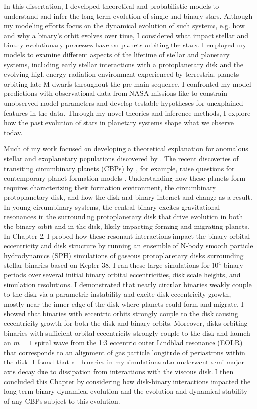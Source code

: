 In this dissertation, I developed theoretical and probabilistic models to understand and infer the long-term evolution of single and binary stars. Although my modeling efforts focus on the dynamical evolution of such systems, e.g. how and why a binary's orbit evolves over time, I considered what impact stellar and binary evolutionary processes have on planets orbiting the stars. I employed my models to examine different aspects of the lifetime of stellar and planetary systems, including early stellar interactions with a protoplanetary disk and the evolving high-energy radiation environment experienced by terrestrial planets orbiting late M-dwarfs throughout the pre-main sequence. I confronted my model predictions with observational data from NASA missions like \kepler to constrain unobserved model parameters and develop testable hypotheses for unexplained features in the data. Through my novel theories and inference methods, I explore how the past evolution of stars in planetary systems shape what we observe today.

Much of my work focused on developing a theoretical explanation for anomalous stellar and exoplanetary populations discovered by \kepler. The recent discoveries of transiting circumbinary planets (CBPs) by \kepler, for example, raise questions for contemporary planet formation models \citep[see][]{Welsh2014}.  Understanding how these planets form requires characterizing their formation environment, the circumbinary protoplanetary disk, and how the disk and binary interact and change as a result.  In young circumbinary systems, the central binary excites gravitational resonances in the surrounding protoplanetary disk that drive evolution in both the binary orbit and in the disk, likely impacting forming and migrating planets.  In Chapter 2, I probed how these resonant interactions impact the binary orbital eccentricity and disk structure by running an ensemble of N-body smooth particle hydrodynamics (SPH) simulations of gaseous protoplanetary disks surrounding stellar binaries based on Kepler-38. I ran these large simulations for $10^4$ binary periods over several initial binary orbital eccentricities, disk scale heights, and simulation resolutions.  I demonstrated that nearly circular binaries weakly couple to the disk via a parametric instability and excite disk eccentricity growth, mostly near the inner-edge of the disk where planets could form and migrate.  I showed that binaries with eccentric orbits strongly couple to the disk causing eccentricity growth for both the disk and binary orbits. Moreover, disks orbiting binaries with sufficient orbital eccentricity strongly couple to the disk and launch an $m = 1$ spiral wave from the 1:3 eccentric outer Lindblad resonance (EOLR) that corresponds to an alignment of gas particle longitude of periastrons within the disk. I found that all binaries in my simulations also underwent semi-major axis decay due to dissipation from interactions with the viscous disk. I then concluded this Chapter by considering how disk-binary interactions impacted the long-term binary dynamical evolution and the evolution and dynamical stability of any CBPs subject to this evolution. 

